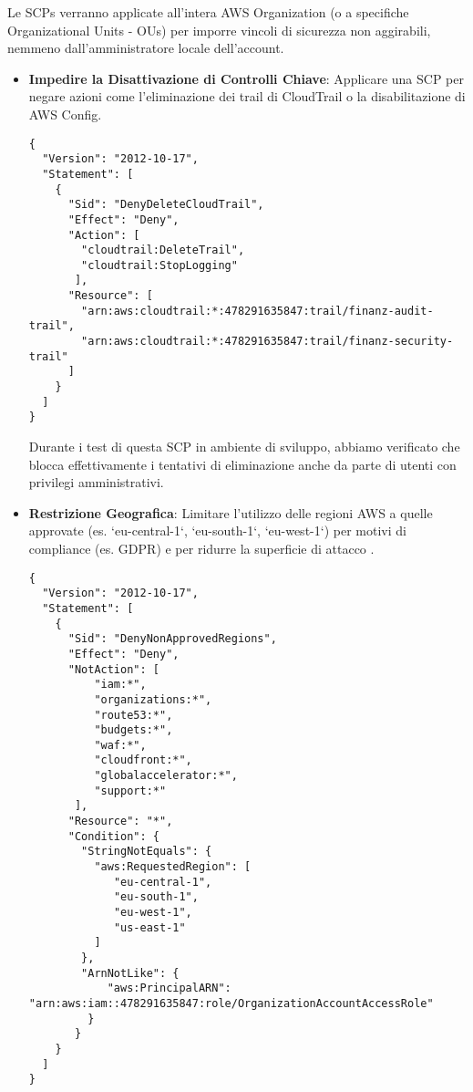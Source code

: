 Le SCPs verranno applicate all'intera AWS Organization (o a specifiche Organizational Units - OUs) per imporre vincoli di sicurezza non aggirabili, nemmeno dall'amministratore locale dell'account.
\begin{itemize}
    \item \textbf{Impedire la Disattivazione di Controlli Chiave}: Applicare una SCP per negare azioni come l'eliminazione dei trail di CloudTrail o la disabilitazione di AWS Config.
    \begin{lstlisting}[style=json, caption={SCP per prevenire l'eliminazione di CloudTrail}, label=lst:scp-deny-cloudtrail-delete]
{
  "Version": "2012-10-17",
  "Statement": [
    {
      "Sid": "DenyDeleteCloudTrail",
      "Effect": "Deny",
      "Action": [
        "cloudtrail:DeleteTrail",
        "cloudtrail:StopLogging"
       ],
      "Resource": [
        "arn:aws:cloudtrail:*:478291635847:trail/finanz-audit-trail",
        "arn:aws:cloudtrail:*:478291635847:trail/finanz-security-trail"
      ]
    }
  ]
}
    \end{lstlisting}
    Durante i test di questa SCP in ambiente di sviluppo, abbiamo verificato che blocca effettivamente i tentativi di eliminazione anche da parte di utenti con privilegi amministrativi.
    \item \textbf{Restrizione Geografica}: Limitare l'utilizzo delle regioni AWS a quelle approvate (es. `eu-central-1`, `eu-south-1`, `eu-west-1`) per motivi di compliance (es. GDPR) e per ridurre la superficie di attacco \cite{awsbuilders:scps}.
    \begin{lstlisting}[style=json, caption={SCP per limitare le regioni utilizzabili}, label=lst:scp-region-restriction]
{
  "Version": "2012-10-17",
  "Statement": [
    {
      "Sid": "DenyNonApprovedRegions",
      "Effect": "Deny",
      "NotAction": [
          "iam:*",
          "organizations:*",
          "route53:*",
          "budgets:*",
          "waf:*",
          "cloudfront:*",
          "globalaccelerator:*",
          "support:*"
       ],
      "Resource": "*",
      "Condition": {
        "StringNotEquals": {
          "aws:RequestedRegion": [
             "eu-central-1",
             "eu-south-1",
             "eu-west-1",
             "us-east-1"
          ]
        },
        "ArnNotLike": {
            "aws:PrincipalARN": "arn:aws:iam::478291635847:role/OrganizationAccountAccessRole"
         }
       }
    }
  ]
}
    \end{lstlisting}
\end{itemize}

